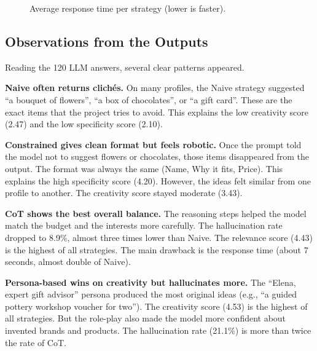 \begin{figure}[H]
\centering
{}
\caption{Average response time per strategy (lower is faster).}
\label{fig:time}
\end{figure}

\subsection{Observations from the Outputs}

Reading the 120 LLM answers, several clear patterns appeared.

\textbf{Naive often returns clichés.} On many profiles, the Naive strategy suggested ``a bouquet of flowers'', ``a box of chocolates'', or ``a gift card''. These are the exact items that the project tries to avoid. This explains the low creativity score (2.47) and the low specificity score (2.10).

\textbf{Constrained gives clean format but feels robotic.} Once the prompt told the model not to suggest flowers or chocolates, those items disappeared from the output. The format was always the same (Name, Why it fits, Price). This explains the high specificity score (4.20). However, the ideas felt similar from one profile to another. The creativity score stayed moderate (3.43).

\textbf{CoT shows the best overall balance.} The reasoning steps helped the model match the budget and the interests more carefully. The hallucination rate dropped to 8.9\%, almost three times lower than Naive. The relevance score (4.43) is the highest of all strategies. The main drawback is the response time (about 7 seconds, almost double of Naive).

\textbf{Persona-based wins on creativity but hallucinates more.} The ``Elena, expert gift advisor'' persona produced the most original ideas (e.g., ``a guided pottery workshop voucher for two''). The creativity score (4.53) is the highest of all strategies. But the role-play also made the model more confident about invented brands and products. The hallucination rate (21.1\%) is more than twice the rate of CoT.

